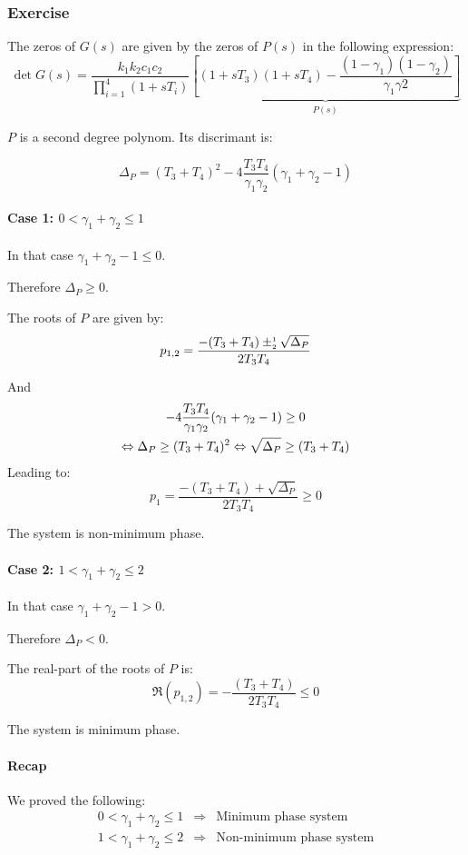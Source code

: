 \subsubsection{Exercise}

The zeros of $G(s)$ are given by the zeros of $P(s)$ in the following expression:
$$
\det G(s) = \frac{k_1k_2c_1c_2}{\prod_{i=1}^{4} (1 + s T_i)}
\underbrace{\left[ (1+sT_3)(1+sT_4) - \frac{(1-\gamma_1)(1 - \gamma_2)}{\gamma_1\gamma2}\right]}_{P(s)}
$$

$P$ is a second degree polynom. Its discrimant is:

$$
\Delta_P = (T_3+T_4)^2 - 4\frac{T_3T_4}{\gamma_1\gamma_2}(\gamma_1+\gamma_2-1) 
$$

\paragraph{Case 1: $0 < \gamma_1 + \gamma_2 \leq 1$}
In that case $\gamma_1 + \gamma_2 - 1 \leq 0$. 

Therefore
$\Delta_P \geq 0$.

The roots of $P$ are given by:
$$
p_{1,2} = \frac{-(T_3+T_4) \pm_\text{\tiny{2}}^\text{\tiny{1}} \sqrt{\Delta_P}}{2T_3T_4}
$$

And 
\begin{multline*}
    -4\frac{T_3T_4}{\gamma_1\gamma_2}(\gamma_1+\gamma_2-1) \geq 0 \\ \Leftrightarrow \Delta_P \geq (T_3+T_4)^2 \Leftrightarrow \sqrt{\Delta_P}\geq (T_3+T_4)$$
\end{multline*}
Leading to:
$$
p_1 = \frac{-(T_3+T_4) + \sqrt{\Delta_P}}{2T_3T_4} \geq 0
$$

The system is non-minimum phase.


\paragraph{Case 2: $1 < \gamma_1 + \gamma_2 \leq 2$}
In that case $\gamma_1+\gamma_2 -1 > 0$.

Therefore
$\Delta_P < 0$.

The real-part of the roots of $P$ is:
$$
\Re(p_{1,2}) = -\frac{(T_3+T_4)}{2T_3T_4} \leq 0
$$

The system is minimum phase.

\paragraph{Recap}

We proved the following:
$$
\begin{array}{rcl}
    0 < \gamma_1 + \gamma_2 \leq 1 & \Rightarrow & \text{Minimum phase system} \\
    1 < \gamma_1 + \gamma_2 \leq 2 & \Rightarrow & \text{Non-minimum phase system} \\
\end{array}
$$
